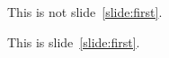\documentclass{beamer}
\begin{document}
    \begin{frame}
        This is not slide~\ref{slide:first}.
    \end{frame}
    \begin{frame}
        \label{slide:first}
        This is slide~\ref{slide:first}.
    \end{frame}
\end{document}
